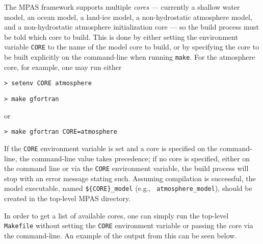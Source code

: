 The MPAS framework supports multiple {\em cores} --- currently a shallow water
model, an ocean model, a land-ice model, a non-hydrostatic atmosphere model, and
a non-hydrostatic atmosphere initialization core --- so the build process must be told which core
to build. This is done by either setting the environment variable {\tt CORE} to
the name of the model core to build, or by specifying the core to be built
explicitly on the command-line when running {\tt make}. For the atmosphere
core, for example, one may run either

\vspace{12pt}
{\tt > setenv CORE atmosphere}

{\tt > make gfortran}
\vspace{12pt}

\noindent or

\vspace{12pt}
{\tt > make gfortran CORE=atmosphere}
\vspace{12pt}

If the {\tt CORE} environment variable is set and a core is specified on the
command-line, the command-line value takes precedence; if no core is specified,
either on the command line or via the {\tt CORE} environment variable, the build
process will stop with an error message stating such.  Assuming compilation is
successful, the model executable, named {\tt \$\{CORE\}\_model} (e.g., {\tt
atmosphere\_model}), should be created in the top-level MPAS directory.

In order to get a list of available cores, one can simply run the top-level {\tt
Makefile} without setting the {\tt CORE} environment variable or passing the
core via the command-line. An example of the output from this can be seen
below.

